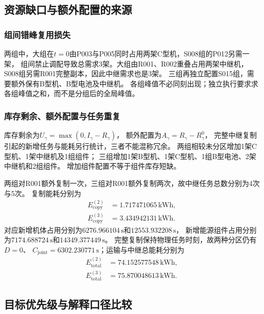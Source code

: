 \subsection{资源缺口与额外配置的来源}
\subsubsection{组间错峰复用损失}
两组中，大组在$t=0$由P003与P005同时占用两架C型机，S008组的P012另需一架，
组间禁止调配导致总需求3架。大组由R001、R002重叠占用两架中继机，
S008组另需R001完整副本，因此中继需求也是3架。
三组再独立配置S015组，需要额外保有B型机、B型电池及中继机。
各组峰值不必同刻出现；独立执行要求求各组峰值之和，而不是分组后的全局峰值。

\subsubsection{库存剩余、额外配置与任务重复}
库存剩余为$U_\gamma=\max(0,I_\gamma-R_\gamma)$，
额外配置为$A_\gamma=R_\gamma-R^0_\gamma$，
完整中继复制引起的新增任务与能耗另行统计，三者不能混称冗余。
两组相较未分区增加1架C型机、1架中继机及1组组件；
三组增加1架B型机、1架C型机、1组B型电池、2架中继机和2组组件。
增加组件配置不等于组件库存短缺。

两组对R001额外复制一次，三组对R001额外复制两次，故中继任务总数分别为4次与5次。
复制能耗分别为
\begin{align}
E_{\mathrm{copy}}^{(2)}&=1.717471065\,\mathrm{kWh},\\
E_{\mathrm{copy}}^{(3)}&=3.434942131\,\mathrm{kWh}.
\end{align}
对应新增机体占用分别为$6276.966104\,\mathrm{s}$和$12553.932208\,\mathrm{s}$，
新增能源组件占用分别为$7174.688724\,\mathrm{s}$和$14349.377449\,\mathrm{s}$。
完整复制保持物理任务时刻，故两种分区仍有$D=0$、
$C_{\mathrm{joint}}=6302.230771\,\mathrm{s}$；运输与中继总能耗分别为
\begin{align}
E_{\mathrm{total}}^{(2)}&=74.152577548\,\mathrm{kWh},\\
E_{\mathrm{total}}^{(3)}&=75.870048613\,\mathrm{kWh}.
\end{align}

\subsection{目标优先级与解释口径比较}
